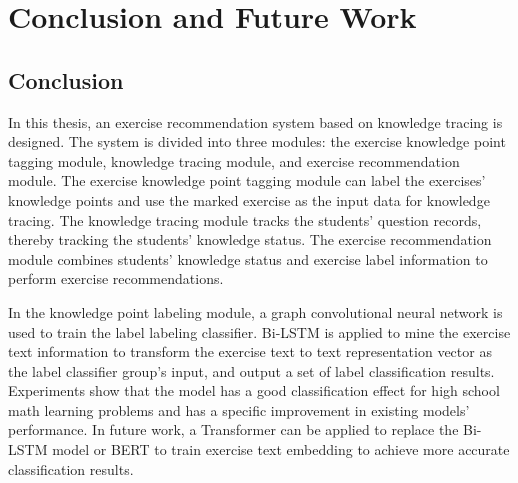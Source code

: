 \chapter{Conclusion and Future Work}
\section{Conclusion}
In this thesis, an exercise recommendation system based on knowledge tracing is designed. The system is divided into three modules: the exercise knowledge point tagging module, knowledge tracing module, and exercise recommendation module. The exercise knowledge point tagging module can label the exercises' knowledge points and use the marked exercise as the input data for knowledge tracing. The knowledge tracing module tracks the students' question records, thereby tracking the students' knowledge status. The exercise recommendation module combines students' knowledge status and exercise label information to perform exercise recommendations.


In the knowledge point labeling module, a graph convolutional neural network is used to train the label labeling classifier. Bi-LSTM is applied to mine the exercise text information to transform the exercise text to text representation vector as the label classifier group's input, and output a set of label classification results. Experiments show that the model has a good classification effect for high school math learning problems and has a specific improvement in existing models' performance. In future work, a Transformer can be applied to replace the Bi-LSTM model or BERT to train exercise text embedding to achieve more accurate classification results.

